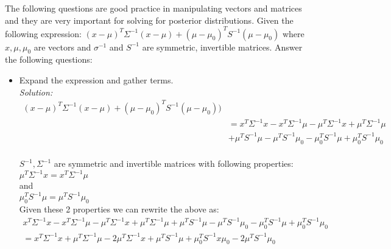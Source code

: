 \documentclass{../amsml}
\begin{document}

\begin{problem}
The following questions are good practice in manipulating vectors and matrices and they are very important for solving for posterior distributions.
Given the following expression:
$(x - \mu)^T  \Sigma^{-1}(x - \mu) + (\mu - \mu_0)^T S^{-1}(\mu - \mu_0)$ 
where $x, \mu , \mu_0$ are vectors and $\sigma^{-1}$ and $S^{-1}$ are symmetric, invertible matrices.
Answer the following questions:

\begin{itemize}
	\item Expand the expression and gather terms. \\
		\emph{Solution: }  \\
			\begin{equation} 
				\begin{split}
					(x-\mu)^T\Sigma^{-1}(x-\mu) + (\mu - \mu_0)^T S^{-1}(\mu - 	\mu_0))\\
					& = x^T \Sigma^{-1} x - x^T \Sigma^{-1} \mu - \mu ^ T 			\Sigma^{-1} x + \mu ^ T \Sigma^{-1} \mu \\
					& + \mu ^ T S^{-1} \mu - \mu^T S^{-1} \mu_0 - \mu_0^T S^{-1} 		\mu + \mu_0 ^ T S^{-1} \mu_0
				\end{split}
			\end{equation} \\
			$S^{-1},\Sigma^{-1}$ are symmetric and invertible matrices with following properties:\\
			
			$\mu^T \Sigma^{-1}x = x^T\Sigma^{-1}\mu$  \\ 
			and   \\
			$\mu_0^T S^{-1}\mu = \mu^T S^{-1}\mu_0$ \\ 
			
			Given these 2 properties we can rewrite the above as: \\
			\begin{equation}
				\begin{split}
					x^T \Sigma^{-1} x - x ^ T \Sigma^{-1} \mu - \mu ^ T \Sigma^{-1} x + \mu ^ T \Sigma^{-1} \mu + \mu^T S^{-1} \mu - \mu ^ T S^{-1} \mu_0 - \mu_0^T S^{-1} \mu + \mu_0^T S^{-1} \mu_0 \\
					= x^T \Sigma^{-1} x + \mu^T \Sigma^{-1} \mu - 2 \mu^T \Sigma^{-1} x + \mu^T S^{-1} \mu + \mu_0^T S^{-1}x \mu_0 - 2 \mu^T S^{-1} \mu_0
				\end{split}
			\end{equation} \\
			

\end{itemize}
\end{problem}
\end{document}
